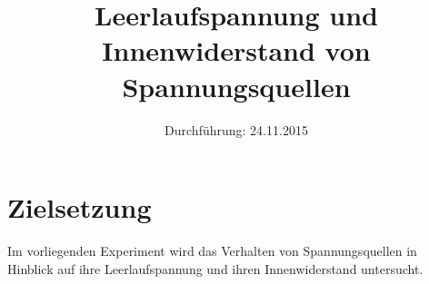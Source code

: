 

\subject{Versuchsprotokoll zum Versuch Nr. 301}
\title{Leerlaufspannung und Innenwiderstand von Spannungsquellen}
\date{
  Durchführung: 24.11.2015
}



\maketitle
\newpage

\section{Zielsetzung}

Im vorliegenden Experiment wird das Verhalten von Spannungsquellen in Hinblick auf ihre Leerlaufspannung und ihren Innenwiderstand untersucht.








\printbibliography


